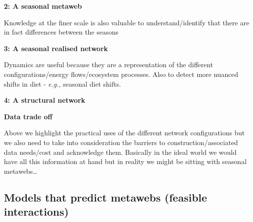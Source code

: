 \documentclass[
]{article}
\begin{document}
\begin{tcolorbox}
\textbf{2: A seasonal metaweb}

Knowledge at the finer scale is also valuable to understand/identify
that there are in fact differences between the seasons

\textbf{3: A seasonal realised network}

Dynamics are useful because they are a representation of the different
configurations/energy flows/ecosystem processes. Also to detect more
nuanced shifts in diet - \emph{e.g.,} seasonal diet shifts.

\textbf{4: A structural network}

\textbf{Data trade off}

Above we highlight the practical uses of the different network
configurations but we also need to take into consideration the barriers
to construction/associated data needs/cost and acknowledge them.
Basically in the ideal world we would have all this information at hand
but in reality we might be sitting with seasonal metawebs\ldots{}

\end{tcolorbox}

\subsection{Models that predict metawebs (feasible
interactions)}\label{models-that-predict-metawebs-feasible-interactions}
\end{document}

